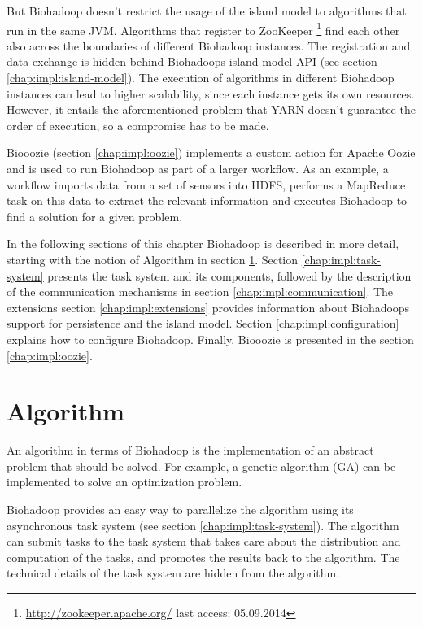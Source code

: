 But Biohadoop doesn't restrict the usage of the island model to algorithms that run in the same JVM. Algorithms that register to ZooKeeper \footnote{\url{http://zookeeper.apache.org/} last access: 05.09.2014} find each other also across the boundaries of different Biohadoop instances. The registration and data exchange is hidden behind Biohadoops island model API (see section \ref{chap:impl:island-model}). The execution of algorithms in different Biohadoop instances can lead to higher scalability, since each instance gets its own resources. However, it entails the aforementioned problem that YARN doesn't guarantee the order of execution, so a compromise has to be made.

Biooozie (section \ref{chap:impl:oozie}) implements a custom action for Apache Oozie and is used to run Biohadoop as part of a larger workflow. As an example, a workflow imports data from a set of sensors into HDFS, performs a MapReduce task on this data to extract the relevant information and executes Biohadoop to find a solution for a given problem.

In the following sections of this chapter Biohadoop is described in more detail, starting with the notion of Algorithm in section \ref{chap:impl:algorithm}. Section \ref{chap:impl:task-system} presents the task system and its components, followed by the description of the communication mechanisms in section \ref{chap:impl:communication}. The extensions section \ref{chap:impl:extensions} provides information about Biohadoops support for persistence and the island model. Section \ref{chap:impl:configuration} explains how to configure Biohadoop. Finally, Biooozie is presented in the section \ref{chap:impl:oozie}.

\section{Algorithm}
\label{chap:impl:algorithm}
An algorithm in terms of Biohadoop is the implementation of an abstract problem that should be solved. For example, a genetic algorithm (GA) can be implemented to solve an optimization problem.

Biohadoop provides an easy way to parallelize the algorithm using its asynchronous task system (see section \ref{chap:impl:task-system}). The algorithm can submit tasks to the task system that takes care about the distribution and computation of the tasks, and promotes the results back to the algorithm. The technical details of the task system are hidden from the algorithm.

